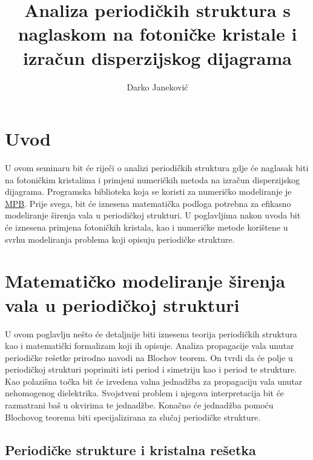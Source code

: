 \documentclass[utf8, seminar]{fer}
\begin{document}
\title{Analiza periodičkih struktura s naglaskom na fotoničke kristale
	   i izračun disperzijskog dijagrama}
\author{Darko Janeković}

\maketitle

\tableofcontents


\chapter{Uvod}
U ovom seminaru bit će riječi o analizi periodičkih struktura gdje će naglasak
biti na fotoničkim kristalima i primjeni numeričkih metoda na izračun
disperzijskog dijagrama. Programska biblioteka koja se koristi za numeričko
modeliranje je \href{https://github.com/stevengj/mpb}{MPB}. Prije svega, bit će
iznesena matematička podloga potrebna za efikasno modeliranje širenja vala u
periodičkoj strukturi. U poglavljima nakon uvoda bit će iznesena primjena
fotoničkih kristala, kao i numeričke metode korištene u svrhu modeliranja
problema koji opisuju periodičke strukture.


\chapter{Matematičko modeliranje širenja vala u periodičkoj strukturi}


U ovom poglavlju nešto će detaljnije biti iznesena teorija periodičkih struktura
kao i matematički formalizam koji ih opisuje. Analiza propagacije vala unutar
periodičke rešetke prirodno navodi na Blochov teorem. On tvrdi da će polje u
periodičkoj strukturi poprimiti isti period i simetriju kao i period te strukture.
Kao polazišna točka bit će izvedena valna jednadžba za propagaciju vala unutar
nehomogenog dielektrika. Svojstveni problem i njegova interpretacija bit će
razmatrani baš u okvirima te jednadžbe. Konačno će jednadžba pomoću Blochovog
teorema biti specijalizirana za slučaj periodičke strukture.


\section{Periodičke strukture i kristalna rešetka}
\end{document}
